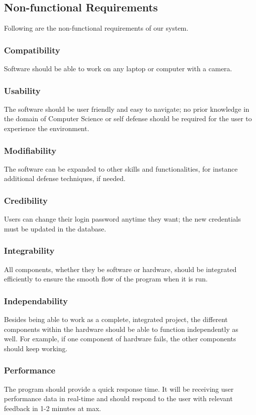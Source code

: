 
\subsection{Non-functional Requirements}
Following are the non-functional requirements of our system.
\subsubsection{Compatibility}
Software should be able to work on any laptop or computer with a camera.
\subsubsection{Usability}
The software should be user friendly and easy to navigate; no prior knowledge in the domain of Computer Science or self defense should be required for the user to experience the environment. 
\subsubsection{Modifiability}
The software can be expanded to other skills and functionalities, for instance additional defense techniques, if needed.
\subsubsection{Credibility}
Users can change their login password anytime they want; the new credentials must be updated in the database. 
\subsubsection{Integrability}
All components, whether they be software or hardware, should be integrated efficiently to ensure the smooth flow of the program when it is run. 
\subsubsection{Independability}
Besides being able to work as a complete, integrated project, the different components within the hardware should be able to function independently as well. For example, if one component of hardware fails, the other components should keep working. 
\subsubsection{Performance}
The program should provide a quick response time. It will be receiving user performance data in real-time and should respond to the user with relevant feedback in 1-2 minutes at max. 
